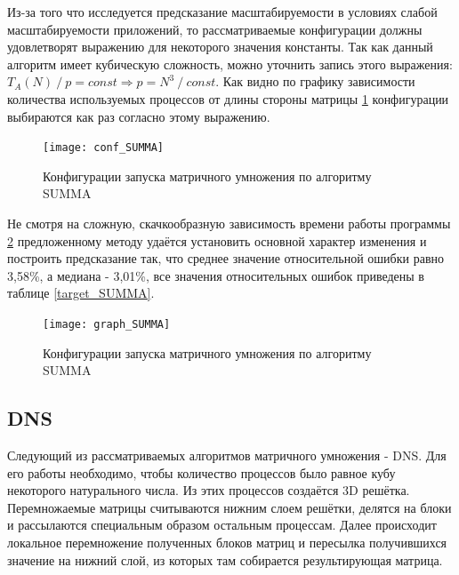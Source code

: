 		Из-за того что исследуется предсказание масштабируемости в условиях слабой масштабируемости приложений, то рассматриваемые конфигурации должны удовлетворят выражению \cite{weak_sc} для некоторого значения константы. Так как данный алгоритм имеет кубическую сложность, можно уточнить запись этого выражения: \(T_A(N)\:/\:p = const \Rightarrow p = N^3\:/\:const\). Как видно по графику зависимости количества используемых процессов от длины стороны матрицы \ref{conf_SUMMA} конфигурации выбираются как раз согласно этому выражению.

		\begin{figure}[t]
			\centering
			\texttt{[image: conf\_SUMMA]}
			\caption{Конфигурации запуска матричного умножения по алгоритму SUMMA}
			\label{conf_SUMMA}
		\end{figure}

		Не смотря на сложную, скачкообразную зависимость времени работы программы \ref{graph_SUMMA} предложенному методу удаётся установить основной характер изменения и построить предсказание так, что среднее значение относительной ошибки равно 3,58\%, а медиана - 3,01\%, все значения относительных ошибок приведены в таблице \ref{target_SUMMA}.

		\begin{figure}[t]
			\centering
			\texttt{[image: graph\_SUMMA]}
			\caption{Конфигурации запуска матричного умножения по алгоритму SUMMA}
			\label{graph_SUMMA}
		\end{figure}

		\subsection{DNS}
			Следующий из рассматриваемых алгоритмов матричного умножения - DNS. Для его работы необходимо, чтобы количество процессов было равное кубу некоторого натурального числа. Из этих процессов создаётся 3D решётка. Перемножаемые матрицы считываются нижним слоем решётки, делятся на блоки и рассылаются специальным образом остальным процессам. Далее происходит локальное перемножение полученных блоков матриц и пересылка получившихся значение на нижний слой, из которых там собирается результирующая матрица.

